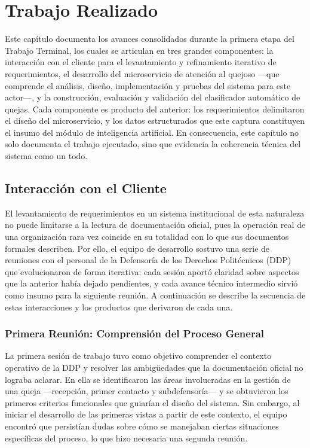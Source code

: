 \chapter{Trabajo Realizado}
\label{cap:trabajo_realizado}

Este capítulo documenta los avances consolidados durante la primera etapa del 
Trabajo Terminal, los cuales se articulan en tres grandes componentes: la 
interacción con el cliente para el levantamiento y refinamiento iterativo de 
requerimientos, el desarrollo del microservicio de atención al quejoso —que 
comprende el análisis, diseño, implementación y pruebas del sistema para este 
actor—, y la construcción, evaluación y validación del clasificador automático 
de quejas. Cada componente es producto del anterior: los requerimientos delimitaron 
el diseño del microservicio, y los datos estructurados que este captura constituyen 
el insumo del módulo de inteligencia artificial. En consecuencia, este capítulo 
no solo documenta el trabajo ejecutado, sino que evidencia la coherencia técnica 
del sistema como un todo.


\section{Interacción con el Cliente}
\label{sec:interaccion_cliente}

El levantamiento de requerimientos en un sistema institucional de esta naturaleza 
no puede limitarse a la lectura de documentación oficial, pues la operación real 
de una organización rara vez coincide en su totalidad con lo que sus documentos 
formales describen. Por ello, el equipo de desarrollo sostuvo una serie de 
reuniones con el personal de la Defensoría de los Derechos Politécnicos (DDP) 
que evolucionaron de forma iterativa: cada sesión aportó claridad sobre aspectos 
que la anterior había dejado pendientes, y cada avance técnico intermedio sirvió 
como insumo para la siguiente reunión. A continuación se describe la secuencia 
de estas interacciones y los productos que derivaron de cada una.

\subsection{Primera Reunión: Comprensión del Proceso General}

La primera sesión de trabajo tuvo como objetivo comprender el contexto operativo 
de la DDP y resolver las ambigüedades que la documentación oficial no lograba 
aclarar. En ella se identificaron las áreas involucradas en la gestión de una 
queja —recepción, primer contacto y subdefensoría— y se obtuvieron los primeros 
criterios funcionales que guiarían el diseño del sistema. Sin embargo, al iniciar 
el desarrollo de las primeras vistas a partir de este contexto, el equipo encontró 
que persistían dudas sobre cómo se manejaban ciertas situaciones específicas del 
proceso, lo que hizo necesaria una segunda reunión.

